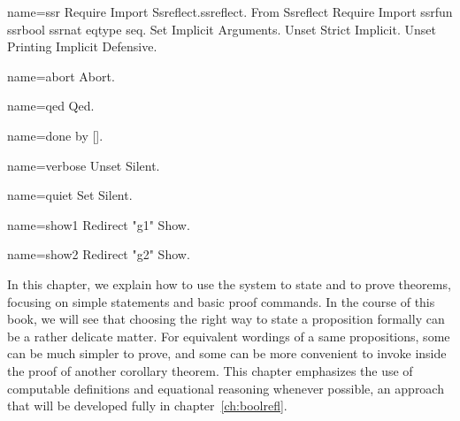\begin{coqdef}{name=ssr}
Require Import Ssreflect.ssreflect.
From Ssreflect Require Import ssrfun ssrbool ssrnat eqtype seq.
Set Implicit Arguments.
Unset Strict Implicit.
Unset Printing Implicit Defensive.
\end{coqdef}
\begin{coqdef}{name=abort}
Abort.
\end{coqdef}
\begin{coqdef}{name=qed}
Qed.
\end{coqdef}
\begin{coqdef}{name=done}
by [].
\end{coqdef}
\begin{coqdef}{name=verbose}
Unset Silent.
\end{coqdef}
\begin{coqdef}{name=quiet}
Set Silent.
\end{coqdef}
\begin{coqdef}{name=show1}
Redirect "g1" Show.
\end{coqdef}
\begin{coqdef}{name=show2}
Redirect "g2" Show.
\end{coqdef}

\label{ch:proofs}

In this chapter, we explain how to use the \Coq{} system to state and
to prove theorems, focusing on simple statements and basic proof
commands. In the course of this book, we will see that choosing the
right way to state a proposition formally can be a rather delicate
matter. For equivalent wordings of a same propositions, some can be
much simpler to prove, and some can be more convenient to invoke
inside the proof of another corollary theorem. This chapter emphasizes
the use of computable definitions and equational reasoning
whenever possible, an approach that will be developed fully in
chapter~\ref{ch:boolrefl}.



